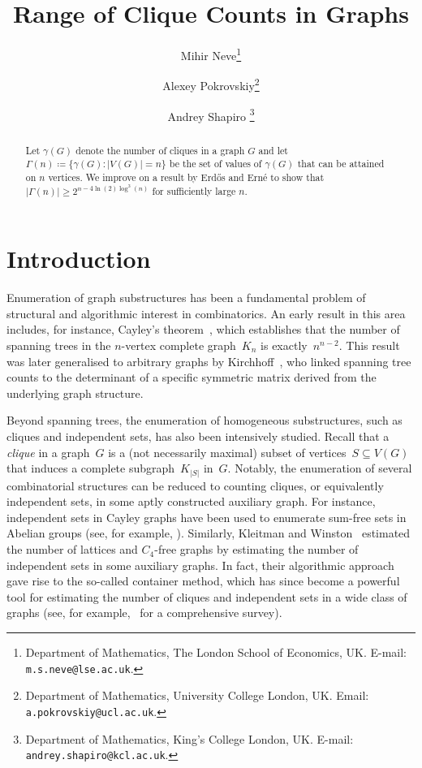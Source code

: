\documentclass[11pt, final]{article}
\title{Range of Clique Counts in Graphs}
\author{%
Mihir Neve\thanks{Department of Mathematics, The London School of
Economics, UK. E-mail: {\tt  m.s.neve@lse.ac.uk}.}
\and
Alexey Pokrovskiy\thanks{Department of Mathematics, University College London, UK. Email: {\tt a.pokrovskiy@ucl.ac.uk}.}
\and
Andrey Shapiro \thanks{Department of Mathematics, King’s College London, UK. E-mail: {\tt andrey.shapiro@kcl.ac.uk}.}
}
\date{}
\theoremstyle{definition}
\begin{document}
\maketitle

\begin{abstract}
    Let $\gamma(G)$ denote the number of cliques in a graph $G$ and let $\Gamma(n)\coloneqq \{\gamma(G):|V(G)|=n\}$ be the set of values of $\gamma(G)$ that can be attained on $n$ vertices. We improve on a result by Erd\H{o}s and Ern\'e to show that $| \Gamma(n)| \geq 2^{n-4\ln(2)\log^3(n)}$ for sufficiently large $n$.
\end{abstract}

\section{Introduction}

Enumeration of graph substructures has been a fundamental problem of structural and algorithmic interest in combinatorics. An early result in this area includes, for instance, Cayley's theorem~\cite{borchardt1860ueber, cayley1889theorem}, which establishes that the number of spanning trees in the $n$-vertex complete graph~$K_n$ is exactly~$n^{n-2}$. This result was later generalised to arbitrary graphs by Kirchhoff~\cite{kirchhoff1847ueber}, who linked spanning tree counts to the determinant of a specific symmetric matrix derived from the underlying graph structure. 

Beyond spanning trees, the enumeration of  homogeneous substructures, such as cliques and independent sets, has also been intensively studied. Recall that a \emph{clique} in a graph~$G$ is a (not necessarily maximal) subset of vertices~$S \subseteq V(G)$ that induces a complete subgraph~$K_{|S|}$ in~$G$. Notably, the enumeration of several combinatorial structures can be reduced to counting cliques, or equivalently independent sets, in some aptly constructed auxiliary graph. For instance, independent sets in Cayley graphs have been used to enumerate sum-free sets in Abelian groups (see, for example, \cite{sum_free_sets_Alon}). Similarly, Kleitman and Winston~\cite{C_4free, Lattices} estimated the number of lattices and $C_4$-free graphs by estimating the number of independent sets in some auxiliary graphs. In fact, their algorithmic approach gave rise to the so-called container method, which has since become a powerful tool for estimating the number of cliques and independent sets in a wide class of graphs (see, for example,~\cite{container_ind_sets} for a comprehensive survey).  
\end{document}
